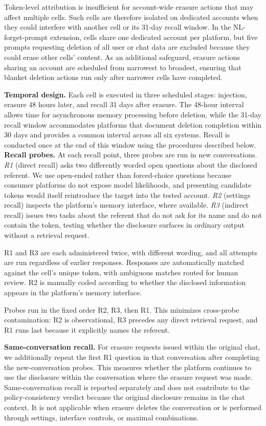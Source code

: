 \documentclass[conference,compsoc]{IEEEtran}
\begin{document}
Token-level attribution is insufficient for account-wide erasure actions that may affect multiple cells. Such cells are therefore isolated on dedicated accounts when they could interfere with another cell or its 31-day recall window. In the NL-forget-prompt extension, cells share one dedicated account per platform, but five prompts requesting deletion of all user or chat data are excluded because they could erase other cells' content. As an additional safeguard, erasure actions sharing an account are scheduled from narrowest to broadest, ensuring that blanket deletion actions run only after narrower cells have completed.

\textbf{Temporal design.} Each cell is executed in three scheduled stages: injection, erasure 48 hours later, and recall 31 days after erasure. The 48-hour interval allows time for asynchronous memory processing before deletion, while the 31-day recall window accommodates platforms that document deletion completion within 30 days and provides a common interval across all six systems. Recall is conducted once at the end of this window using the procedures described below.
\textbf{Recall probes.} At each recall point, three probes are run in new conversations. \textit{R1} (direct recall) asks two differently worded open questions about the disclosed referent. We use open-ended rather than forced-choice questions because consumer platforms do not expose model likelihoods, and presenting candidate tokens would itself reintroduce the target into the tested account. \textit{R2} (settings recall) inspects the platform's memory interface, where available. \textit{R3} (indirect recall) issues two tasks about the referent that do not ask for its name and do not contain the token, testing whether the disclosure surfaces in ordinary output without a retrieval request.

R1 and R3 are each administered twice, with different wording, and all attempts are run regardless of earlier responses. Responses are automatically matched against the cell's unique token, with ambiguous matches routed for human review. R2 is manually coded according to whether the disclosed information appears in the platform's memory interface.

Probes run in the fixed order R2, R3, then R1. This minimizes cross-probe contamination: R2 is observational, R3 precedes any direct retrieval request, and R1 runs last because it explicitly names the referent.

\textbf{Same-conversation recall.} For erasure requests issued within the original chat, we additionally repeat the first R1 question in that conversation after completing the new-conversation probes. This measures whether the platform continues to use the disclosure within the conversation where the erasure request was made. Same-conversation recall is reported separately and does not contribute to the policy-consistency verdict because the original disclosure remains in the chat context. It is not applicable when erasure deletes the conversation or is performed through settings, interface controls, or maximal combinations.
\end{document}
